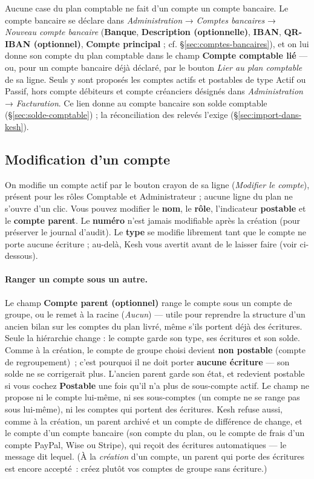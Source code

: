 \documentclass[a4paper,11pt,oneside]{article}
\begin{document}
Aucune case du plan comptable ne fait d'un compte un compte bancaire. Le compte bancaire se
déclare dans \emph{Administration} → \emph{Comptes bancaires} → \emph{Nouveau compte bancaire}
(\textbf{Banque}, \textbf{Description (optionnelle)}, \textbf{IBAN}, \textbf{QR-IBAN (optionnel)},
\textbf{Compte principal} ; cf. \S\ref{sec:comptes-bancaires}), et on
lui donne son compte du plan comptable dans le champ \textbf{Compte comptable lié} --- ou, pour un
compte bancaire déjà déclaré, par le bouton \emph{Lier au plan comptable} de sa ligne. Seuls y
sont proposés les comptes actifs et postables de type Actif ou Passif, hors compte débiteurs et
compte créanciers désignés dans \emph{Administration} → \emph{Facturation}. Ce lien donne au compte
bancaire son solde comptable (\S\ref{sec:solde-comptable}) ; la réconciliation des relevés
l'exige (\S\ref{sec:import-dans-kesh}).

\subsection{Modification d'un compte}\label{sec:modification-compte}

On modifie un compte actif par le bouton crayon de sa ligne (\emph{Modifier le compte}), présent pour
les rôles Comptable et Administrateur ; aucune ligne du plan ne s'ouvre d'un clic. Vous pouvez modifier le \textbf{nom}, le \textbf{rôle},
l'indicateur \textbf{postable} et le \textbf{compte parent}. Le \textbf{numéro} n'est jamais modifiable après la création
(pour préserver le journal d'audit). Le \textbf{type} se modifie librement tant que le compte ne porte aucune écriture ; au-delà, Kesh vous avertit avant de le laisser faire (voir ci-dessous).

\paragraph{Ranger un compte sous un autre.} Le champ \textbf{Compte parent (optionnel)} range le
compte sous un compte de groupe, ou le remet à la racine (\emph{Aucun}) --- utile pour reprendre la
structure d'un ancien bilan sur les comptes du plan livré, même s'ils portent déjà des écritures.
Seule la hiérarchie change : le compte garde son type, ses écritures et son solde. Comme à la
création, le compte de groupe choisi devient \textbf{non postable} (compte de regroupement)~;
c'est pourquoi il ne doit porter \textbf{aucune écriture} --- son solde ne se corrigerait plus.
L'ancien parent garde son état, et redevient postable si vous cochez \textbf{Postable} une fois
qu'il n'a plus de sous-compte actif. Le champ ne propose ni le compte lui-même, ni ses
sous-comptes (un compte ne se range pas sous lui-même), ni les comptes qui portent des écritures.
Kesh refuse aussi, comme à la création, un parent archivé et un compte de différence de change,
et le compte d'un compte bancaire (son compte du plan, ou le compte de frais d'un compte
PayPal, Wise ou Stripe), qui reçoit des écritures automatiques --- le message dit lequel. (À la \emph{création} d'un compte, un parent qui porte des écritures
est encore accepté~: créez plutôt vos comptes de groupe sans écriture.)
\end{document}
